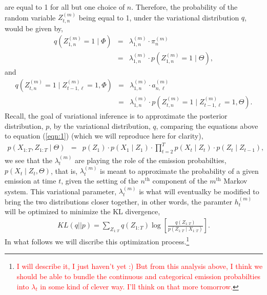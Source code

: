 \documentclass{amsart}
\begin{document}
are equal to 1 for all but one choice of $n$.   
Therefore, the probability of the random 
variable $Z_{t,n}^{(m)}$ being equal to 1, under the variational
distribution $q$, would be given by,
\begin{eqnarray*}
q(Z_{1,n}^{(m)} = 1\mid \Phi) &=& \lambda_{1,n}^{(m)}\cdot \pi_n^{(m)} \\
& = &  
\lambda_{1,n}^{(m)}\cdot p(Z_{1,n}^{(m)} = 1\mid \Theta),
\end{eqnarray*}
and 
\begin{eqnarray*}
q(Z_{t,n}^{(m)}=1\mid Z_{t-1,\ell}^{(m)} =1, \Phi) &=&  
\lambda_{1,n}^{(m)}\cdot a_{n,\ell}^{(m)}\\
& = & \lambda_{1,n}^{(m)}\cdot p(Z_{t,n}^{(m)}=1\mid 
Z_{t-1,\ell}^{(m)}=1,\Theta).
\end{eqnarray*}
Recall, the goal of variational inference is to approximate 
the posterior distribution, $p$, by the variational distribution, $q$, 
comparing the equations above to equation 
(\ref{eqn:1}) (which we will reproduce here for clarity),
\begin{eqnarray*}
p(X_{1:T},Z_{1:T}\mid \Theta) & = & p(Z_1)\cdot p(X_1\mid Z_1)\cdot 
\prod_{t=2}^Tp(X_t\mid Z_t)\cdot p(Z_t\mid Z_{t-1}),
\end{eqnarray*} 
we see that the $\lambda_t^{(m)}$ are playing the role of the 
emission probabilties, $p(X_t\mid Z_t, \Theta)$, that is, 
$\lambda_t^{(m)}$ is meant to approximate the probability of a given 
emission at time $t$, given the setting of the $n^\text{th}$ component 
of the $m^\text{th}$ Markov system.  This variational parameter, 
$\lambda_t^{(m)}$ is what will eventualky be modified to bring the two 
distributions closer together, in other words, the paramter $h_t^{(m)}$ 
will be optimized to minimize the KL divergence, 
\begin{eqnarray*}
KL(q||p) = \sum_{Z_{1:T}}q(Z_{1:T})\log\left[\frac{q(Z_{1:T})}{p(Z_{1:T}\mid 
X_{1:T})}\right].
\end{eqnarray*} 
In what follows we will discribe this optimization 
process.\footnote{\textcolor{red}{I will describe it, I just haven't 
yet :)  But from this analysis above, I think we should be able to 
bundle the continuous and categorical emission probabilties into 
$\lambda_t$ in some kind of clever way.  I'll think on that more 
tomorrow.}}
  



\end{document}
